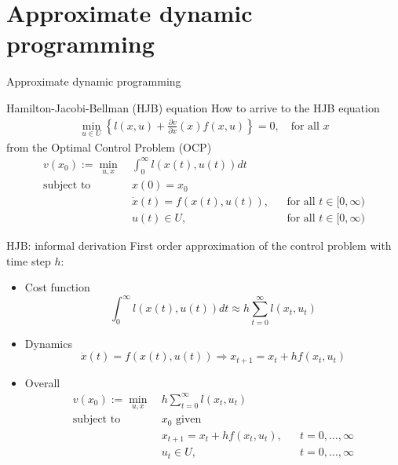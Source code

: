 \documentclass[aspectratio=169]{beamer}
\begin{document}
\section{Approximate dynamic programming}
\begin{frame}
\huge
\centering
{\color{darkred} Approximate dynamic programming}
\end{frame}

\begin{frame}{Hamilton-Jacobi-Bellman (HJB) equation}
How to arrive to the HJB equation
\begin{align*}
\min_{u \in U} \left\{ l(x, u) + \frac{\partial v}{\partial x} (x) f(x, u) \right\} = 0, \quad \text{for all } x
\end{align*}
from the Optimal Control Problem (OCP)
\begin{align*}
v(x_0) := \min_{u, x} \ &\int_0^\infty l(x(t), u(t)) dt \\
\text{subject to} \ & x(0) = x_0 \\
& \dot x(t) = f(x(t), u(t)), &&  \text{for all }t \in [0, \infty) \\
& u(t) \in U, &&  \text{for all }t \in [0, \infty)
\end{align*}
\end{frame}

\begin{frame}{HJB: informal derivation}
First order approximation of the control problem with time step $h$:
\begin{itemize}
\item
Cost function
$$
\int_0^\infty l(x(t), u(t)) dt
\approx
h \sum_{t=0}^\infty l(x_t, u_t)
$$
\item
Dynamics
$$
\dot x(t) = f(x(t), u(t))
\Rightarrow
x_{t+1} = x_t + h f(x_t, u_t)
$$
\item
Overall
\begin{align*}
v(x_0) := \min_{u, x} \ &h \sum_{t=0}^\infty l(x_t, u_t) \\
\text{subject to} \ & x_0 \text{ given} \\
& x_{t+1} = x_t + h f(x_t, u_t), &&  t = 0, \ldots, \infty \\
& u_t \in U, &&  t = 0, \ldots, \infty
\end{align*}
\end{itemize}
\end{frame}
\end{document}
